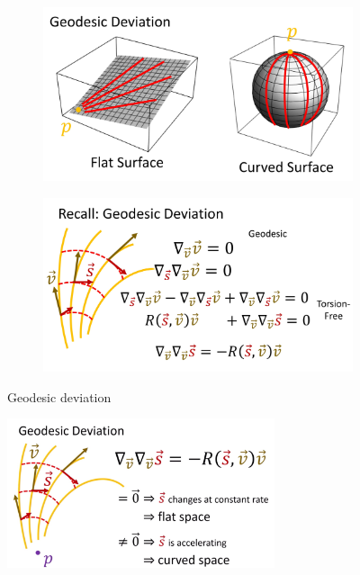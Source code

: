 \documentclass[12pt]{article} %
\begin{document}
\begin{enumerate}[label=\textbf{\arabic*})]
\begin{enumerate}[label=(\textbf{\alph*})]
    \begin{figure}[H]
     \centering
     \begin{subfigure}[b]{0.45\textwidth}
         \centering
         \includegraphics[width=\textwidth]{Figs/c2.jpg}
     \end{subfigure}
     \hfill
     \begin{subfigure}[b]{0.45\textwidth}
         \centering
         \includegraphics[width=\textwidth]{Figs/c3.jpg}
     \end{subfigure}
     \caption{\small Geodesic deviation} \label{fig:asgrre}
\end{figure}
     \begin{figure}[H]
    \centering
    \includegraphics[width=0.7\textwidth]{Figs/c4.jpg}

\end{figure}
\end{enumerate}
\end{enumerate}
\end{document}
